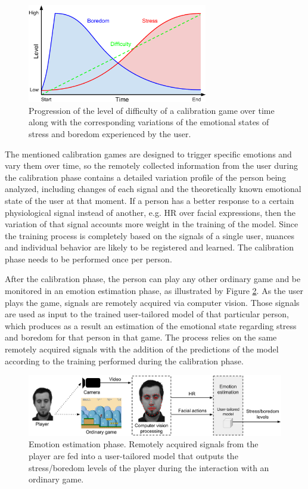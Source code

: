 \begin{figure}[h!]
    \centering
    \includegraphics[width=0.7\textwidth]{Content/figures/calibration-game-linear}
    \caption{Progression of the level of difficulty of a calibration game over time along with the corresponding variations of the emotional states of stress and boredom experienced by the user.}
    \label{fig:calibration-game-linear}
\end{figure}

The mentioned calibration games are designed to trigger specific emotions and vary them over time, so the remotely collected information from the user during the calibration phase contains a detailed variation profile of the person being analyzed, including changes of each signal and the theoretically known emotional state of the user at that moment. If a person has a better response to a certain physiological signal instead of another, e.g. HR over facial expressions, then the variation of that signal accounts more weight in the training of the model. Since the training process is completely based on the signals of a single user, nuances and individual behavior are likely to be registered and learned. The calibration phase needs to be performed once per person.

After the calibration phase, the person can play any other ordinary game and be monitored in an emotion estimation phase, as illustrated by Figure \ref{fig:user-tailored-use}. As the user plays the game, signals are remotely acquired via computer vision. Those signals are used as input to the trained user-tailored model of that particular person, which produces as a result an estimation of the emotional state regarding stress and boredom for that person in that game. The process relies on the same remotely acquired signals with the addition of the predictions of the model according to the training performed during the calibration phase.

\begin{figure}[h]
    \centering
    \includegraphics[width=\textwidth]{Content/figures/user-tailored-use}
    \caption{Emotion estimation phase. Remotely acquired signals from the player are fed into a user-tailored model that outputs the stress/boredom levels of the player during the interaction with an ordinary game.}
    \label{fig:user-tailored-use}
\end{figure}

